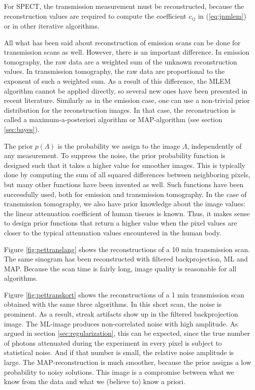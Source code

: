 \documentclass[11pt,oneside]{book}
\begin{document}
For SPECT, the transmission measurement must be reconstructed, because the
reconstruction values are required to compute the coefficient $c_{ij}$ in
(\ref{eq:jnmlem}) or in other iterative algorithms.

All what has been said about reconstruction of emission scans can be done for
transmission scans as well. However, there is an important difference. In
emission tomography, the raw data are a weighted sum of the unknown
reconstruction values. In transmission tomography, the raw data are
proportional to the exponent of such a weighted sum. As a result of this
difference, the MLEM algorithm cannot be applied directly, so several new
ones have been presented in recent literature. Similarly as in the emission
case, one can use a non-trivial prior distribution for the reconstruction
images. In that case, the reconstruction is called a maximum-a-posteriori
algorithm or MAP-algorithm (see section \ref{sec:bayes}).

The prior $p(\Lambda)$ is the probability we assign to the image $\Lambda$,
independently of any measurement. To suppress the noise, the prior probability
function is designed such that it takes a higher value for smoother images.
This is typically done by computing the sum of all squared differences between
neighboring pixels, but many other functions have been invented as well.
Such functions have been successfully used, both for emission and transmission
tomography. In the case of transmission tomography, we also have prior knowledge
about the image values: the linear attenuation coefficient of human tissues is
known. Thus, it makes sense to design prior functions that return a higher value
when the pixel values are closer to the typical attenuation values encountered
in the human body.

Figure \ref{fig:pettranslang} shows the reconstructions of a 10 min
transmission scan. The same sinogram has been reconstructed with filtered
backprojection, ML and MAP. Because the scan time is fairly long, image
quality is reasonable for all algorithms.

Figure \ref{fig:pettranskort} shows the reconstructions of a 1 min
transmission scan obtained with the same three algorithms. In this short scan,
the noise is prominent. As a result, streak artifacts show up in the filtered
backprojection image. The ML-image produces non-correlated noise with high
amplitude. As argued in section \ref{sec:regularization}, this can be expected,
since the true number of photons attenuated during the experiment in every
pixel is subject to statistical noise. And if that number is small, the
relative noise amplitude is large. The MAP-reconstruction is much smoother,
because the prior assigns a low probability to noisy solutions. This image is
a compromise between what we know from the data and what we (believe to) know
a priori.
\end{document}

